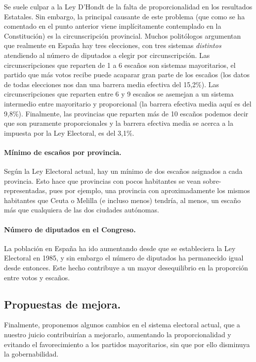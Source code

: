 \documentclass[11pt]{article}
\begin{document}
	Se suele culpar a la Ley D'Hondt de la falta de proporcionalidad en los resultados Estatales. Sin embargo, la principal causante de este problema (que como se ha comentado en el punto anterior viene implícitamente contemplado en la Constitución) es la circunscripción provincial. Muchos politólogos argumentan que realmente en España hay tres elecciones, con tres sistemas \textit{distintos} atendiendo al número de diputados a elegir por circunscripción. Las circunscripciones que reparten de 1 a 6 escaños son sistemas mayoritarios, el partido que más votos recibe puede acaparar gran parte de los escaños (los datos de todas elecciones nos dan una barrera media efectiva del 15,2\%). Las circunscripciones que reparten entre 6 y 9 escaños se asemejan a un sistema intermedio entre mayoritario y proporcional (la barrera efectiva media aquí es del 9,8\%). Finalmente, las provincias que reparten más de 10 escaños podemos decir que son puramente proporcionales y la barrera efectiva media se acerca a la impuesta por la Ley Electoral, es del 3,1\%.
	
	\paragraph{Mínimo de escaños por provincia.}
	
	Según la Ley Electoral actual, hay un mínimo de dos escaños asignados a cada provincia. Esto hace que provincias con pocos habitantes se vean sobre-representadas, pues por ejemplo, una provincia con aproximadamente los mismos habitantes que Ceuta o Melilla (e incluso menos) tendría, al menos, un escaño más que cualquiera de las dos ciudades autónomas. 
	
	\paragraph{Número de diputados en el Congreso.}
	
	La población en España ha ido aumentando desde que se estableciera la Ley Electoral en 1985, y sin embargo el número de diputados ha permanecido igual desde entonces. Este hecho contribuye a un mayor desequilibrio en la proporción entre votos y escaños. 
	
	\subsection{Propuestas de mejora.}
	
	Finalmente, proponemos algunos cambios en el sistema electoral actual, que a nuestro juicio contribuirían a mejorarlo, aumentando la proporcionalidad y evitando el favorecimiento a los partidos mayoritarios, sin que por ello disminuya la gobernabilidad.
	
\end{document}
